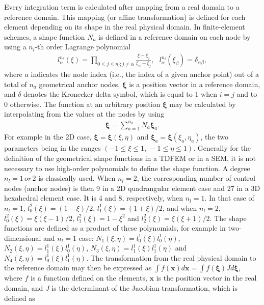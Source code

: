             Every integration term is calculated after mapping from a real domain to a reference domain. This mapping (or affine transformation) is defined for
each element depending on its shape in the real physical domain. In finite-element schemes, a shape function $N_a$ is
defined in a reference domain on each node by using a $n_l$-th order Lagrange polynomial
            \begin{align} \label{eq:sem_13}
                l_\alpha^{n_l}(\xi)=\prod_{0\leq j\leq n_l;  j\neq \alpha} \frac{\xi-\xi_j}{\xi_\alpha-\xi_j}, \,\,\,\,
l_\alpha^{n_l}(\xi_\beta)=\delta_{\alpha\beta},
            \end{align}
            where $a$ indicates the node index (i.e., the index of a given anchor point) out of a total of $n_a$ geometrical anchor nodes,
$\bm{\xi}$ is a position vector in a reference domain, and $\delta$ denotes the Kronecker delta symbol, which is equal to 1 when $i = j$ and to 0 otherwise.
            The function at an arbitrary position $\bm{\xi}$ may be calculated by interpolating from the values at the nodes by using
            \begin{align} \label{eq:sem_14}
                \bm{\xi}=\sum_{a=1}^{n_a} N_a \bm{\xi}_a.
            \end{align}
            For example in the 2D case,
            $\bm{\xi}=\bm{\xi}(\xi,\eta)$ and $\bm{\xi}_a=\bm{\xi}(\xi_a,\eta_a)$, the two parameters being in the ranges $(-1\leq \xi \leq 1,\, -1\leq \eta \leq 1)$.
            Generally for the definition of the geometrical shape functions in a TDFEM or in a SEM, it is not necessary to use high-order polynomials to define the shape function.
A degree $n_l=1\, or\,2$ is classically used.
When $n_l=2$, the corresponding number of control nodes (anchor nodes) is then 9 in a 2D quadrangular element case and 27 in a 3D hexahedral element case.
It is 4 and 8, respectively, when $n_l=1$.
            In that case of $n_l=1$, $l_0^2(\xi)=(1-\xi)/2$, $l_1^1(\xi)=(1+\xi)/2$, and when $n_l=2$, $l_0^2(\xi)=\xi(\xi-1)/2$, $l_1^2(\xi)=1-\xi^2$ and
$l_2^2(\xi)=\xi(\xi+1)/2$.
            The shape functions are defined as a product of these polynomials, for example in two-dimensional and $n_l=1$ case:
$N_1(\xi,\eta)=l_0^1(\xi)l_0^1(\eta)$, $N_2(\xi,\eta)=l_1^1(\xi)l_0^1(\eta)$, $N_3(\xi,\eta)=l_1^1(\xi)l_1^1(\eta)$ and $N_4(\xi,\eta)=l_0^1(\xi)l_1^1(\eta)$.
            The transformation from the real physical domain to the reference domain may then be expressed as $\int f(\bm{x})d\bm{x}= \int f(\bm{\xi})Jd\bm{\xi}$,
where $f$ is a function defined on the elements, $\bm{x}$ is the position vector in the real domain, and $J$ is the determinant of the Jacobian transformation, which is defined as
